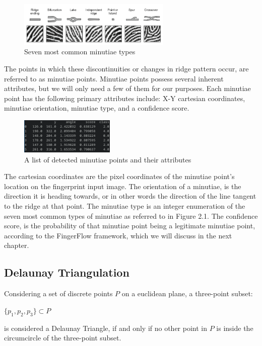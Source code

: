 \documentclass[fyp]{socreport}
\begin{document}
\begin{figure}[H]
	\centering
	\includegraphics[width=0.65\textwidth]
	{minutiae_types}
	\caption{Seven most common minutiae types}
\end{figure}

\newpage The points in which these discontinuities or changes in ridge pattern occur, are referred to as minutiae points. Minutiae points possess several inherent attributes, but we will only need a few of them for our purposes. Each minutiae point has the following primary attributes include: X-Y cartesian coordinates, minutiae orientation, minutiae type, and a confidence score.

\begin{figure}[H]
	\centering
	\includegraphics[width=0.4\textwidth]
	{minutiae_pandas}
	\caption{A list of detected minutiae points and their attributes}
\end{figure}

The cartesian coordinates are the pixel coordinates of the minutiae point's location on the fingerprint input image. The orientation of a minutiae, is the direction it is heading towards, or in other words the direction of the line tangent to the ridge at that point. The minutiae type is an integer enumeration of the seven most common types of minutiae as referred to in Figure 2.1. The confidence score, is the probability of that minutiae point being a legitimate minutiae point, according to the FingerFlow framework, which we will discuss in the next chapter.

\subsection{Delaunay Triangulation}
Considering a set of discrete points $P$ on a euclidean plane, a three-point subset:

\begin{center}
	$\{p_1, p_2, p_3\} \subset P$
\end{center}
 is considered a Delaunay Triangle, if and only if no other point in $P$ is inside the circumcircle of the three-point subset. \cite{delaunay34trig}
 
\end{document}
